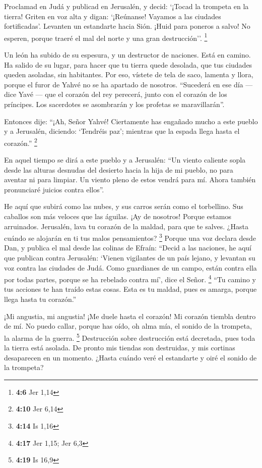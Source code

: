  Proclamad en Judá y publicad en Jerusalén, y decid:
`¡Tocad la trompeta en la tierra! Griten en voz alta y digan:
`¡Reúnanse! Vayamos a las ciudades fortificadas'. 
Levanten un estandarte hacia Sión. ¡Huid para poneros a salvo! No
esperen, porque traeré el mal del norte y una gran destrucción''.
\footnote{\textbf{4:6} Jer 1,14}

 Un león ha subido de su espesura, y un destructor de
naciones. Está en camino. Ha salido de su lugar, para hacer que tu
tierra quede desolada, que tus ciudades queden asoladas, sin habitantes.
 Por eso, vístete de tela de saco, lamenta y llora, porque
el furor de Yahvé no se ha apartado de nosotros. 
``Sucederá en ese día --- dice Yavé --- que el corazón del rey perecerá,
junto con el corazón de los príncipes. Los sacerdotes se asombrarán y
los profetas se maravillarán''.

 Entonces dije: ``¡Ah, Señor Yahvé! Ciertamente has
engañado mucho a este pueblo y a Jerusalén, diciendo: `Tendréis paz';
mientras que la espada llega hasta el corazón.'' \footnote{\textbf{4:10}
  Jer 6,14}

 En aquel tiempo se dirá a este pueblo y a Jerusalén:
``Un viento caliente sopla desde las alturas desnudas del desierto hacia
la hija de mi pueblo, no para aventar ni para limpiar. 
Un viento pleno de estos vendrá para mí. Ahora también pronunciaré
juicios contra ellos''.

 He aquí que subirá como las nubes, y sus carros serán
como el torbellino. Sus caballos son más veloces que las águilas. ¡Ay de
nosotros! Porque estamos arruinados.  Jerusalén, lava tu
corazón de la maldad, para que te salves. ¿Hasta cuándo se alojarán en
ti tus malos pensamientos? \footnote{\textbf{4:14} Is 1,16}
 Porque una voz declara desde Dan, y publica el mal desde
las colinas de Efraín:  ``Decid a las naciones, he aquí
que publican contra Jerusalén: `Vienen vigilantes de un país lejano, y
levantan su voz contra las ciudades de Judá.  Como
guardianes de un campo, están contra ella por todas partes, porque se ha
rebelado contra mí', dice el Señor. \footnote{\textbf{4:17} Jer 1,15;
  Jer 6,3}  ``Tu camino y tus acciones te han traído
estas cosas. Esta es tu maldad, pues es amarga, porque llega hasta tu
corazón.''

 ¡Mi angustia, mi angustia! ¡Me duele hasta el corazón!
Mi corazón tiembla dentro de mí. No puedo callar, porque has oído, oh
alma mía, el sonido de la trompeta, la alarma de la guerra. \footnote{\textbf{4:19}
  Is 16,9}  Destrucción sobre destrucción está decretada,
pues toda la tierra está asolada. De pronto mis tiendas son destruidas,
y mis cortinas desaparecen en un momento.  ¿Hasta cuándo
veré el estandarte y oiré el sonido de la trompeta?

